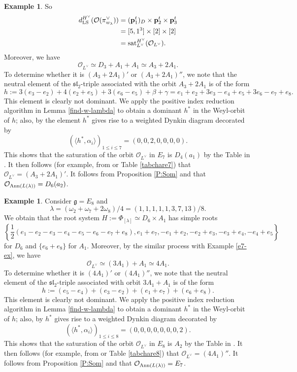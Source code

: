 \documentclass[reqno,12pt]{amsart}
\numberwithin{equation}{section}
\theoremstyle{plain}
\theoremstyle{definition}
\newtheorem{ex}[Thm]{Example}
\newcommand{\lam}{\lambda}
\renewcommand{\subset}{\subseteq}
\newcommand{\lest}{\leqslant}
\begin{document}
\begin{ex}
So \begin{align*}
    d_{\rm LS}^{H^\vee} (\mathcal{O}(\pi_{w_{\lam}}^\vee))&= ({\bf p}_{1}^t)_D\times {\bf p}^t_{2}\times {\bf p}^t_{3} \\
    &=[5,1^3] \times [2]\times [2]\\
    &= {\rm sat}_{L^\vee}^{H^\vee} (\mathcal{O}_{L^\vee}).
\end{align*}
Moreover, we have
$$\mathcal{O}_{L^\vee} \simeq D_3 + A_1+A_1 \simeq A_3+2A_1.$$
To determine whether it is $(A_3+2A_1)'$ or $(A_3+2A_1)''$, we note that the neutral element of the $\mathfrak{sl}_2$-triple associated with the orbit $A_3+2A_1$ is of the form
$$h:=3(e_3 - e_2) + 4(e_2+e_5) + 3(e_6 - e_5)+\beta+\gamma=e_1+e_2+3e_3-e_4+e_5+3e_6-e_7+e_8.$$
This element is clearly not dominant. We apply the positive index reduction algorithm in Lemma \ref{find-w-lambda} to obtain a dominant $h^*$ in the Weyl-orbit of $h$; also, by \cite[\S 3.5 ]{CM} the element $h^*$ gives rise to a weighted Dynkin diagram decorated by $$(\langle h^*, \alpha_i \rangle)_{1\lest i \lest 7} = (0,0,2,0,0,0,0).$$
This shows that the saturation of the orbit $\mathcal{O}_{L^\vee}$ in $E_7$ is $D_4(a_1)$ by the Table in \cite[p. 130]{CM}. It then follows (for example, from \cite[p. 559]{som-98} or Table \ref{tabchare7}) that $\mathcal{O}_{L^\vee} = (A_3+2A_1)'$. It follows from Proposition \ref{P:Som} and \cite[Table IX]{Sommers}  that $\mathcal{O}_{{\rm Ann}(L(\lambda))} = D_6(a_2)$.
\end{ex}

\begin{ex} 
Consider $\mathfrak{g}=E_8$ and $$\lambda=(\omega_2 + \omega_7 + 2\omega_8)/4 =(1,1,1,1,1,3,7,13)/8.$$
We obtain that the root system $H:=\Phi_{[\lambda]} \simeq D_6 \times A_1$ has simple roots
$$\left\{\frac{1}{2}(e_1-e_2-e_3-e_4-e_5-e_6-e_7+e_8), e_1 + e_7, -e_1 + e_2, -e_2 + e_3, -e_3 + e_4, -e_4 + e_5 \right\}$$
for $D_6$ and $\{e_6 + e_8\}$ for $A_1$. Moreover, by the similar process with Example \ref{e7-ex}, we have
$$\mathcal{O}_{L^\vee} \simeq (3A_1) + A_1 \simeq 4A_1.$$
To determine whether it is $(4A_1)'$ or $(4A_1)''$, we note that the neutral element of the $\mathfrak{sl}_2$-triple associated with orbit $3A_1 + A_1$ is of the form
$$h:=(e_5 - e_4) + (e_3 - e_2) + (e_1 + e_7) + (e_6 + e_8).$$
This element is clearly not dominant. We apply the positive index reduction algorithm in Lemma \ref{find-w-lambda} to obtain a dominant $h^*$ in the Weyl-orbit of $h$; also, by \cite[\S 3.5 ]{CM} $h^*$ gives rise to a weighted Dynkin diagram decorated by $$(\langle h^*, \alpha_i \rangle)_{1\lest i \lest 8} = (0,0,0,0,0,0,0,2).$$
This shows that the saturation of the orbit $\mathcal{O}_{L^\vee}$ in $E_8$ is $A_2$ by the Table in \cite[p. 130]{CM}. It then follows (for example, from \cite[p. 559]{som-98} or Table \ref{tabchare8}) that $\mathcal{O}_{L^\vee} = (4A_1)''$. It follows from Proposition \ref{P:Som} and \cite[Table X]{Sommers} that $\mathcal{O}_{{\rm Ann}(L(\lambda))} = E_7$.
\end{ex}
\end{document}
